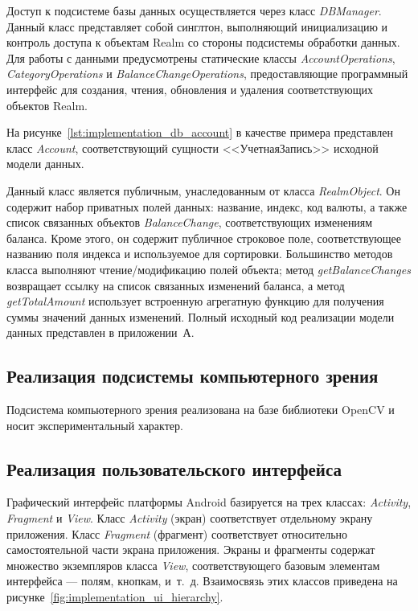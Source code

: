 Доступ к подсистеме базы данных осуществляется через класс
\textit{DBManager}. Данный класс представляет собой синглтон,
выполняющий инициализацию и контроль доступа к объектам Realm
со стороны подсистемы обработки данных.
Для работы с данными предусмотрены статические классы
\textit{AccountOperations}, \textit{CategoryOperations}
и \textit{BalanceChangeOperations}, предоставляющие
программный интерфейс для создания, чтения, обновления и
удаления соответствующих объектов Realm.

На рисунке~\ref{lst:implementation_db_account} в качестве примера
представлен класс \textit{Account}, соответствующий сущности <<УчетнаяЗапись>>
исходной модели данных.



Данный класс является публичным, унаследованным от класса \textit{RealmObject}.
Он содержит набор приватных полей данных: название, индекс, код валюты,
а также список связанных объектов \textit{BalanceChange},
соответствующих изменениям баланса.
Кроме этого, он содержит публичное строковое поле, соответствующее
названию поля индекса и используемое для сортировки.
Большинство методов класса выполняют чтение/модификацию
полей объекта; метод \textit{getBalanceChanges} возвращает ссылку на
список связанных изменений баланса,
а метод \textit{getTotalAmount} использует встроенную
агрегатную функцию для получения суммы значений данных изменений.
Полный исходный код реализации модели данных представлен в приложении~А.

\subsection{Реализация подсистемы компьютерного зрения}
\label{subsec:implementation_cv}

{\color{red} Подсистема компьютерного зрения реализована на базе библиотеки
OpenCV и носит экспериментальный характер.}

\subsection{Реализация пользовательского интерфейса}
\label{subsec:implementation_ui}

Графический интерфейс платформы Android базируется на трех классах:
\textit{Activity}, \textit{Fragment} и \textit{View}.
Класс \textit{Activity} (экран) соответствует отдельному экрану приложения.
Класс \textit{Fragment} (фрагмент) соответствует относительно самостоятельной части
экрана приложения.
Экраны и фрагменты содержат множество экземпляров класса \textit{View},
соответствующего базовым элементам интерфейса --- полям, кнопкам, и~т.~д.
Взаимосвязь этих классов приведена на рисунке~\ref{fig:implementation_ui_hierarchy}.

